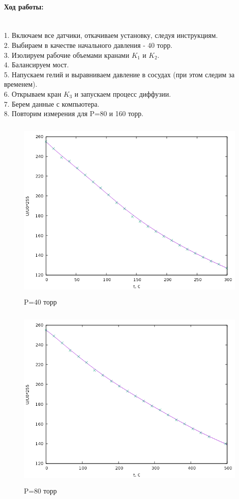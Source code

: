 \documentclass[a4paper]{article}
\begin{document}
	 \paragraph{Ход работы:}\text{ }\\
	   1. Включаем все датчики, откачиваем установку, следуя инструкциям. \\
	   2. Выбираем в качестве начального давления - 40 торр.\\
	   3. Изолируем рабочие объемами кранами $K_1$ и $K_2$.\\
	   4. Балансируем мост.\\
	   5. Напускаем гелий и выравниваем давление в сосудах (при этом следим за временем). \\
	   6. Открываем кран $K_3$ и запускаем процесс диффузии.\\
	   7. Берем данные с компьютера. \\
	 8. Повторим измерения для P=80 и 160 торр.\\
	 \begin{figure}[h!]
		\centering
		\includegraphics[height=90mm]{plot1.png}
		\caption{P=40 торр\label{overflow}}
	   \end{figure}
	 \begin{figure}[h!]
		\centering
		\includegraphics[height=90mm]{plot2.png}
		\caption{P=80 торр\label{overflow}}
	 \end{figure}
\end{document}
